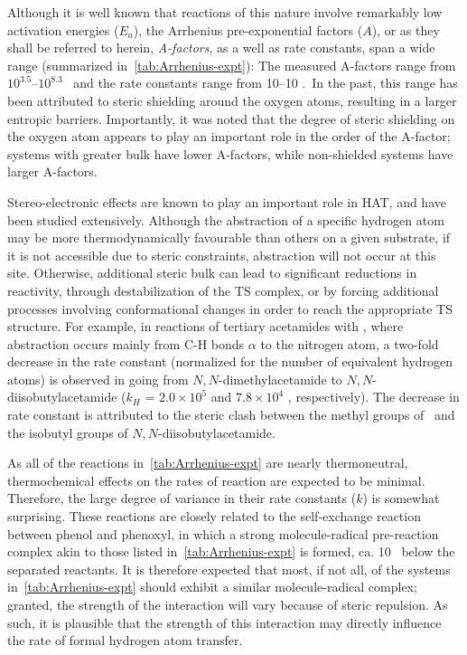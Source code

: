Although it is well known that reactions of this nature involve remarkably low
activation energies ($E_a$),\cite{Lucarini1996, Mahoney1970a, Mahoney1975,
Korcek1972} the Arrhenius pre-exponential factors ($A$), or as they shall be
referred to herein, \emph{A-factors}, as a well as rate constants, span a wide
range (summarized in~\ref{tab:Arrhenius-expt}): The measured A-factors range
from $10^{3.5}$--$10^{8.3}$ \Ms\ and the rate constants range from 10--10
\Ms.\ In the past, this range has been attributed to steric shielding around the
oxygen atoms, resulting in a larger entropic barriers.\cite{DiLabio2005}
Importantly, it was noted that the degree of steric shielding on the oxygen atom
appears to play an important role in the order of the A-factor; systems with
greater bulk have lower A-factors, while non-shielded systems have larger
A-factors.

Stereo-electronic effects are known to play an important role in HAT, and have
been studied extensively.\cite{Finn2004, Salamone2011, Pischel2001, Griller1981,
Bietti2011, Salamone2012, Malatesta1982, Salamone2014} Although the abstraction
of a specific hydrogen atom may be more thermodynamically favourable than others
on a given substrate, if it is not accessible due to steric constraints,
abstraction will not occur at this site. Otherwise, additional steric bulk can
lead to significant reductions in reactivity, through destabilization of the TS
complex, or by forcing additional processes involving conformational changes in
order to reach the appropriate TS structure. For example, in reactions of
tertiary acetamides with \cumo,\cite{Salamone2014} where abstraction occurs
mainly from C-H bonds $\alpha$ to the nitrogen atom, a two-fold decrease in the
rate constant (normalized for the number of equivalent hydrogen atoms) is
observed in going from $N,N$-dimethylacetamide to $N,N$-diisobutylacetamide
($k_H$ = $2.0 \times 10^5$ and $7.8 \times 10^4$ \Ms, respectively). The
decrease in rate constant is attributed to the steric clash between the methyl
groups of \cumo\ and the isobutyl groups of $N,N$-diisobutylacetamide.

As all of the reactions in~\ref{tab:Arrhenius-expt} are nearly thermoneutral,
thermochemical effects on the rates of reaction are expected to be minimal.
Therefore, the large degree of variance in their rate constants ($k$) is
somewhat surprising. These reactions are closely related to the self-exchange
reaction between phenol and phenoxyl,\cite{Mayer2002} in which a strong
molecule-radical pre-reaction complex akin to those listed
in~\ref{tab:Arrhenius-expt} is formed, ca. 10 \kcalmol\ below the separated
reactants. It is therefore expected that most, if not all, of the systems
in~\ref{tab:Arrhenius-expt} should exhibit a similar molecule-radical complex;
granted, the strength of the interaction will vary because of steric repulsion.
As such, it is plausible that the strength of this interaction may directly
influence the rate of formal hydrogen atom transfer.

